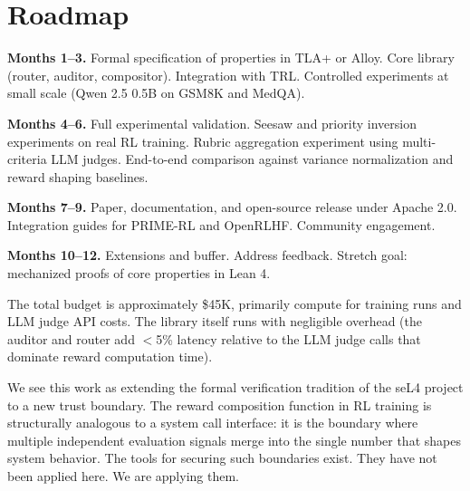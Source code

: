 \documentclass[11pt,a4paper]{article}
\begin{document}
\section{Roadmap}

\textbf{Months 1--3.} Formal specification of properties in TLA+ or Alloy. Core library (router, auditor, compositor). Integration with TRL. Controlled experiments at small scale (Qwen 2.5 0.5B on GSM8K and MedQA).

\textbf{Months 4--6.} Full experimental validation. Seesaw and priority inversion experiments on real RL training. Rubric aggregation experiment using multi-criteria LLM judges. End-to-end comparison against variance normalization and reward shaping baselines.

\textbf{Months 7--9.} Paper, documentation, and open-source release under Apache 2.0. Integration guides for PRIME-RL and OpenRLHF. Community engagement.

\textbf{Months 10--12.} Extensions and buffer. Address feedback. Stretch goal: mechanized proofs of core properties in Lean 4.

The total budget is approximately \$45K, primarily compute for training runs and LLM judge API costs. The library itself runs with negligible overhead (the auditor and router add $<$5\% latency relative to the LLM judge calls that dominate reward computation time).

We see this work as extending the formal verification tradition of the seL4 project to a new trust boundary. The reward composition function in RL training is structurally analogous to a system call interface: it is the boundary where multiple independent evaluation signals merge into the single number that shapes system behavior. The tools for securing such boundaries exist. They have not been applied here. We are applying them.


\end{document}
